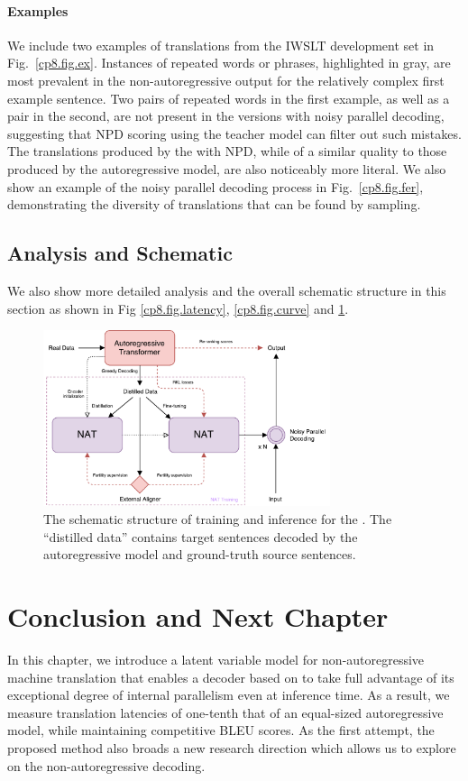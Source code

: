 \paragraph{Examples}
We include two examples of translations from the IWSLT development set in Fig.~\ref{cp8.fig.ex}.
Instances of repeated words or phrases, highlighted in gray, are most prevalent in the non-autoregressive output for the relatively complex first example sentence. Two pairs of repeated words in the first example, as well as a pair in the second, are not present in the versions with noisy parallel decoding, suggesting that NPD scoring using the teacher model can filter out such mistakes. The translations produced by the \model{} with NPD, while of a similar quality to those produced by the autoregressive model, are also noticeably more literal. 
We also show an example of the noisy parallel decoding process in Fig.~\ref{cp8.fig.fer}, demonstrating the diversity of translations that can be found by sampling.

\subsection{Analysis and Schematic}
We also show more detailed analysis and the overall schematic structure in this section as shown in Fig \ref{cp8.fig.latency}, \ref{cp8.fig.curve} and \ref{cp8.fig.sch}. 
\begin{figure}[hptb]
\centering
\includegraphics[width=0.75\textwidth]{figs/nat/NAT-overall}
\caption{\label{cp8.fig.sch}The schematic structure of training and inference for the \model. The ``distilled data'' contains target sentences decoded by the autoregressive model and ground-truth source sentences.}
\end{figure}



\section{Conclusion and Next Chapter}
In this chapter, we introduce a latent variable model for non-autoregressive machine translation that enables a decoder based on \citet{vaswani2017attention} to take full advantage of its exceptional degree of internal parallelism even at inference time. As a result, we measure translation latencies of one-tenth that of an equal-sized autoregressive model, while maintaining competitive BLEU scores. As the first attempt, the proposed method also broads a new research direction which allows us to explore on the non-autoregressive decoding.

